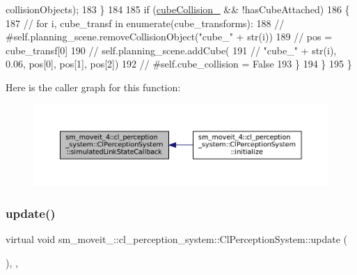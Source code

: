 \begin{DoxyCode}
      collisionObjects);
183                     \}
184 
185                     \textcolor{keywordflow}{if} (\hyperlink{classsm__moveit__4_1_1cl__perception__system_1_1ClPerceptionSystem_aa375d2ad7506dcfc8603558155ee893c}{cubeCollision\_} && !hasCubeAttached)
186                     \{
187                         \textcolor{comment}{//         for i, cube\_transf in enumerate(cube\_transforms):}
188                         \textcolor{comment}{//             #self.planning\_scene.removeCollisionObject("cube\_" + str(i))}
189                         \textcolor{comment}{//             pos = cube\_transf[0]}
190                         \textcolor{comment}{//             self.planning\_scene.addCube(}
191                         \textcolor{comment}{//                 "cube\_" + str(i), 0.06, pos[0],  pos[1],  pos[2])}
192                         \textcolor{comment}{//             #self.cube\_collision = False}
193                     \}
194                 \}
195             \}
\end{DoxyCode}
Here is the caller graph for this function\+:
\nopagebreak
\begin{figure}[H]
\begin{center}
\leavevmode
\includegraphics[width=350pt]{classsm__moveit__4_1_1cl__perception__system_1_1ClPerceptionSystem_a345284941e550bc24c90001351a25087_icgraph}
\end{center}
\end{figure}
\mbox{\label{classsm__moveit__4_1_1cl__perception__system_1_1ClPerceptionSystem_a91de8cf71c93738f8bcbea388c84a5dd}} 
\subsubsection{\texorpdfstring{update()}{update()}}
{\footnotesize\ttfamily virtual void sm\+\_\+moveit\+\_\+::cl\+\_\+perception\+\_\+system\+::\+Cl\+Perception\+System\+::update (\begin{DoxyParamCaption}{ }\end{DoxyParamCaption})\hspace{0.3cm}{\ttfamily [inline]}, {\ttfamily [override]}, {\ttfamily [virtual]}}



